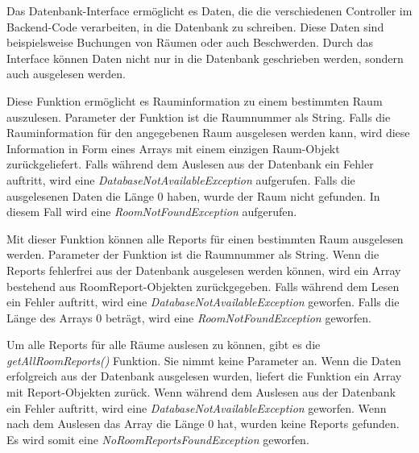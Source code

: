 

Das Datenbank-Interface ermöglicht es Daten, die die verschiedenen Controller im Back\-end-Code verarbeiten, in die Datenbank zu schreiben. Diese Daten sind beispielsweise Buchungen von Räumen oder auch Beschwerden. Durch das Interface können Daten nicht nur in die Datenbank geschrieben werden, sondern auch ausgelesen werden.



Diese Funktion ermöglicht es Rauminformation zu einem bestimmten Raum auszulesen. Parameter der Funktion ist die Raumnummer als String. Falls die Rauminformation für den angegebenen Raum ausgelesen werden kann, wird diese Information in Form eines Arrays mit einem einzigen Raum-Objekt zurückgeliefert. Falls während dem Auslesen aus der Datenbank ein Fehler auftritt, wird eine \emph{DatabaseNotAvailableException} aufgerufen. Falls die ausgelesenen Daten die Länge 0 haben, wurde der Raum nicht gefunden. In diesem Fall wird eine \emph{RoomNotFoundException} aufgerufen.



Mit dieser Funktion können alle Reports für einen bestimmten Raum ausgelesen werden. Parameter der Funktion ist die Raumnummer als String. Wenn die Reports fehlerfrei aus der Datenbank ausgelesen werden können, wird ein Array bestehend aus RoomReport-Objekten zurückgegeben. Falls während dem Lesen ein Fehler auftritt, wird eine \emph{DatabaseNotAvailableException} geworfen. Falls die Länge des Arrays 0 beträgt, wird eine \emph{RoomNotFoundException} geworfen.


Um alle Reports für alle Räume auslesen zu können, gibt es die \emph{getAllRoomReports()} Funktion. Sie nimmt keine Parameter an. Wenn die Daten erfolgreich aus der Datenbank ausgelesen wurden, liefert die Funktion ein Array mit Report-Objekten zurück. Wenn während dem Auslesen aus der Datenbank ein Fehler auftritt, wird eine \emph{DatabaseNotAvailableException} geworfen. Wenn nach dem Auslesen das Array die Länge 0 hat, wurden keine Reports gefunden. Es wird somit eine \emph{NoRoomReportsFoundException} geworfen.

